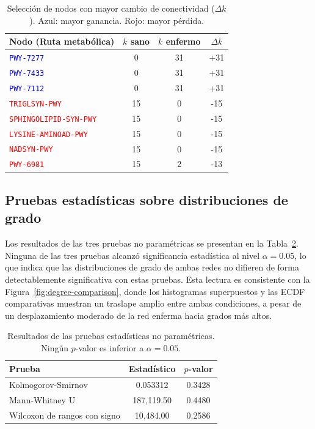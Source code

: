\documentclass[conference]{IEEEtran}
\begin{document}
\begin{table}[!t]
    \centering
    \small
    \begin{tabular}{lccc}
        \toprule
        \textbf{Nodo (Ruta metabólica)} & \textbf{$k$ sano} & \textbf{$k$ enfermo} & \textbf{$\Delta k$} \\
        \midrule
        \textcolor{blue}{\texttt{PWY-7277}} & 0 & 31 & +31 \\
        \textcolor{blue}{\texttt{PWY-7433}} & 0 & 31 & +31 \\
        \textcolor{blue}{\texttt{PWY-7112}} & 0 & 31 & +31 \\
        \textcolor{red}{\texttt{TRIGLSYN-PWY}} & 15 & 0 & -15 \\
        \textcolor{red}{\texttt{SPHINGOLIPID-SYN-PWY}} & 15 & 0 & -15 \\
        \textcolor{red}{\texttt{LYSINE-AMINOAD-PWY}} & 15 & 0 & -15 \\
        \textcolor{red}{\texttt{NADSYN-PWY}} & 15 & 0 & -15 \\
        \textcolor{red}{\texttt{PWY-6981}} & 15 & 2 & -13 \\
        \bottomrule
    \end{tabular}
    \caption{Selección de nodos con mayor cambio de conectividad ($\Delta k$). Azul: mayor ganancia. Rojo: mayor pérdida.}
    \label{tab:nodos}
\end{table}

\subsection{Pruebas estadísticas sobre distribuciones de grado}

Los resultados de las tres pruebas no paramétricas se presentan en la Tabla~\ref{tab:pruebas}. Ninguna de las tres pruebas alcanzó significancia estadística al nivel $\alpha = 0.05$, lo que indica que las distribuciones de grado de ambas redes no difieren de forma detectablemente significativa con estas pruebas. Esta lectura es consistente con la Figura~\ref{fig:degree-comparison}, donde los histogramas superpuestos y las ECDF comparativas muestran un traslape amplio entre ambas condiciones, a pesar de un desplazamiento moderado de la red enferma hacia grados más altos.

\begin{table}[!t]
    \centering
    \begin{tabular}{lcc}
        \toprule
        \textbf{Prueba} & \textbf{Estadístico} & \textbf{$p$-valor} \\
        \midrule
        Kolmogorov-Smirnov & 0.053312 & 0.3428 \\
        Mann-Whitney U & 187,119.50 & 0.4480 \\
        Wilcoxon de rangos con signo & 10,484.00 & 0.2586 \\
        \bottomrule
    \end{tabular}
    \caption{Resultados de las pruebas estadísticas no paramétricas. Ningún $p$-valor es inferior a $\alpha = 0.05$.}
    \label{tab:pruebas}
\end{table}
\end{document}
